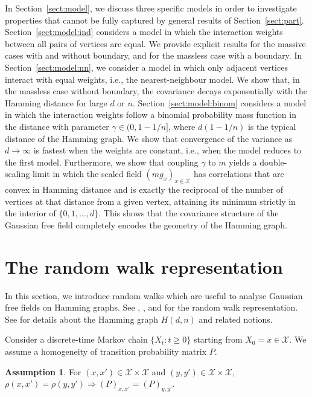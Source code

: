 \documentclass[a4paper,11pt]{article}
\theoremstyle{plain}
\theoremstyle{definition}
\newtheorem{assumption}{Assumption}
\begin{document}
In Section~\ref{sect:model}, we discuss three specific
models in order to investigate properties that cannot
be fully captured by general results of
Section~\ref{sect:part}. Section~\ref{sect:model:ind}
considers a model in which the interaction weights
between all pairs of vertices are equal. We provide
explicit results for the massive cases with and without
boundary, and for the massless case with a boundary.
In Section~\ref{sect:model:nn}, we consider a model
in which only adjacent vertices interact with equal
weights, i.e., the nearest-neighbour model. We show that,
in the massless case without boundary, the covariance
decays exponentially with the Hamming distance for
large $d$ or $n$. Section~\ref{sect:model:binom}
considers a model in which the interaction weights
follow a binomial probability mass function in
the distance with parameter
$\gamma\in(0,1-1/n]$, where $d(1-1/n)$ is the typical
distance of the Hamming graph.
We show that convergence of the variance
as $d\to\infty$ is fastest when the weights are
constant, i.e., when the model reduces to the first model.
Furthermore, we show that coupling $\gamma$ to $m$
yields a double-scaling limit in which the scaled field
$(mg_x)_{x\in\mathcal{X}}$ has correlations that
are convex in Hamming distance and is exactly
the reciprocal of the number of vertices at that
distance from a given vertex, attaining its minimum
strictly in the interior of $\{0,1,\ldots,d\}$. This
shows that the covariance structure of the Gaussian free
field completely encodes the geometry of the Hamming graph.

\section{The random walk representation}
\label{sect:rw}

In this section, we introduce random walks which are
useful to analyse Gaussian free fields on Hamming
graphs. See
\cite[Section 1.1]{BP25}, \cite[Sections 8.4,5]{FV17},
and \cite[Section 13.1]{Georgii88} for the random walk
representation. See \cite[Chapter 1,2]{BBIT21} for
details about the Hamming graph $H(d,n)$ and related
notions. 

Consider a discrete-time Markov chain $\{X_t:t\ge 0\}$
starting from $X_0=x\in\mathcal{X}$. We assume
a homogeneity of transition probability matrix $P$.

\begin{assumption}\label{assump}
  For $(x,x') \in \mathcal{X}\times\mathcal{X}$ and
  $(y,y') \in \mathcal{X}\times\mathcal{X}$,
  $\rho(x,x')=\rho(y,y') \Rightarrow 
  (P)_{x,x'}=(P)_{y,y'}$.
\end{assumption}
\end{document}
